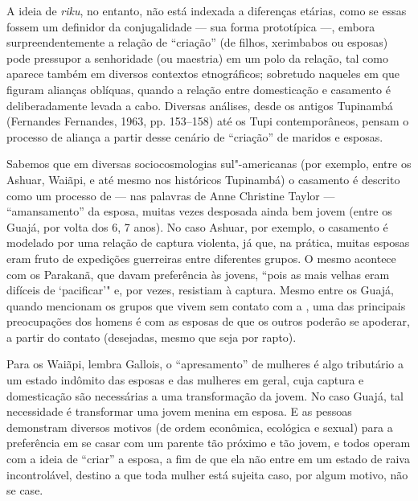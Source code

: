 A ideia de \emph{riku}, no entanto, não está indexada a diferenças
etárias, como se essas fossem um definidor da conjugalidade --- sua forma
prototípica ---, embora surpreendentemente a relação de ``criação'' (de
filhos, xerimbabos ou esposas) pode pressupor a senhoridade (ou
maestria) em um polo da relação, tal como aparece também em diversos
contextos etnográficos; sobretudo naqueles em que figuram alianças
oblíquas, quando a relação entre domesticação e casamento é
deliberadamente levada a cabo. Diversas análises, desde os antigos
Tupinambá (Fernandes Fernandes, 1963, pp. 153--158) até os Tupi
contemporâneos, pensam o processo de aliança a partir desse cenário de
``criação'' de maridos e esposas.

Sabemos que em diversas sociocosmologias sul"-americanas (por exemplo,
entre os Ashuar, Waiãpi, e até mesmo nos históricos Tupinambá) o
casamento é descrito como um processo de --- nas palavras de Anne
Christine Taylor --- ``amansamento'' da esposa, muitas vezes desposada
ainda bem jovem (entre os Guajá, por volta dos 6, 7 anos). No caso
Ashuar, por exemplo, o casamento é modelado por uma relação de captura
violenta, já que, na prática, muitas esposas eram fruto de expedições
guerreiras entre diferentes grupos. O mesmo acontece com os Parakanã,
que davam preferência às jovens, ``pois as mais velhas eram difíceis de
`pacificar'" e, por vezes, resistiam à captura. Mesmo entre os Guajá,
quando mencionam os grupos que vivem sem contato com a , uma das
principais preocupações dos homens é com as esposas de que os outros
poderão se apoderar, a partir do contato (desejadas, mesmo que seja por
rapto).

Para os Waiãpi, lembra Gallois, o ``apresamento'' de mulheres é algo
tributário a um estado indômito das esposas e das mulheres em geral,
cuja captura e domesticação são necessárias a uma transformação da
jovem. No caso Guajá, tal necessidade é transformar uma jovem menina em
esposa. E as pessoas demonstram diversos motivos (de ordem econômica,
ecológica e sexual) para a preferência em se casar com um parente tão
próximo e tão jovem, e todos operam com a ideia de ``criar'' a esposa, a
fim de que ela não entre em um estado de raiva incontrolável, destino a
que toda mulher está sujeita caso, por algum motivo, não se case.

